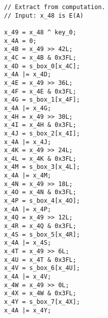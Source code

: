 
\topmargin      0.0cm
\oddsidemargin  1.0cm
\evensidemargin 1.0cm
\textwidth       8.0in
\textheight      11.0in


\Large

\begin{verbatim}
// Extract from computation. 
// Input: x_48 is E(A)

x_49 = x_48 ^ key_0;
x_4A = 0;
x_4B = x_49 >> 42L;
x_4C = x_4B & 0x3FL;
x_4D = s_box_0[x_4C];
x_4A |= x_4D;
x_4E = x_49 >> 36L;
x_4F = x_4E & 0x3FL;
x_4G = s_box_1[x_4F];
x_4A |= x_4G;
x_4H = x_49 >> 30L;
x_4I = x_4H & 0x3FL;
x_4J = s_box_2[x_4I];
x_4A |= x_4J;
x_4K = x_49 >> 24L;
x_4L = x_4K & 0x3FL;
x_4M = s_box_3[x_4L];
x_4A |= x_4M;
x_4N = x_49 >> 18L;
x_4O = x_4N & 0x3FL;
x_4P = s_box_4[x_4O];
x_4A |= x_4P;
x_4Q = x_49 >> 12L;
x_4R = x_4Q & 0x3FL;
x_4S = s_box_5[x_4R];
x_4A |= x_4S;
x_4T = x_49 >> 6L;
x_4U = x_4T & 0x3FL;
x_4V = s_box_6[x_4U];
x_4A |= x_4V;
x_4W = x_49 >> 0L;
x_4X = x_4W & 0x3FL;
x_4Y = s_box_7[x_4X];
x_4A |= x_4Y;
\end{verbatim}


